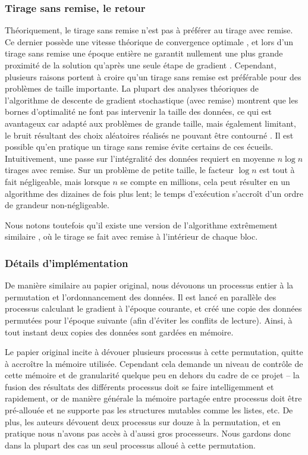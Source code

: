 \documentclass[10pt,a4paper]{article}
\begin{document}
\subsubsection*{Tirage sans remise, le retour}
Théoriquement, le tirage sans remise n'est pas à préférer au tirage avec remise. Ce dernier possède une vitesse théorique de convergence optimale \cite{jelly}\cite{bottou}, et lors d'un tirage sans remise une époque entière ne garantit nullement une plus grande proximité de la solution qu'après une seule étape de gradient \cite{nedic}. Cependant, plusieurs raisons portent à croire qu'un tirage sans remise est préférable pour des problèmes de taille importante. La plupart des analyses théoriques de l'algorithme de descente de gradient stochastique (avec remise) montrent que les bornes d'optimalité ne font pas intervenir la taille des données, ce qui est avantageux car adapté aux problèmes de grande taille, mais également limitant, le bruit résultant des choix aléatoires réalisés ne pouvant être contourné \cite{bottou}\cite{nedic}. Il est possible qu'en pratique un tirage sans remise évite certains de ces écueils. Intuitivement, une passe sur l'intégralité des données requiert en moyenne $n \log n$ tirages avec remise. Sur un problème de petite taille, le facteur $\log n$ est tout à fait négligeable, mais lorsque $n$ se compte en millions, cela peut résulter en un algorithme des dizaines de fois plus lent; le temps d'exécution s'accroît d'un ordre de grandeur non-négligeable.

Nous notons toutefois qu'il existe une version de l'algorithme extrêmement similaire \cite{gemulla_distri}, où le tirage se fait avec remise à l'intérieur de chaque bloc.

\subsubsection*{Détails d'implémentation}

De manière similaire au papier original, nous dévouons un processus entier à la permutation et l'ordonnancement des données. Il est lancé en parallèle des processus calculant le gradient à l'époque courante, et créé une copie des données permutées pour l'époque suivante (afin d'éviter les conflits de lecture). Ainsi, à tout instant deux copies des données sont gardées en mémoire.

Le papier original \cite{jelly} incite à dévouer plusieurs processus à cette permutation, quitte à accroître la mémoire utilisée. Cependant cela demande un niveau de contrôle de cette mémoire et de granularité quelque peu en dehors du cadre de ce projet -- la fusion des résultats des différents processus doit se faire intelligemment et rapidement, or de manière générale la mémoire partagée entre processus doit être pré-allouée et ne supporte pas les structures mutables comme les listes, etc. De plus, les auteurs dévouent deux processus sur douze à la permutation, et en pratique nous n'avons pas accès à d'aussi gros processeurs. Nous gardons donc dans la plupart des cas un seul processus alloué à cette permutation.
\end{document}
